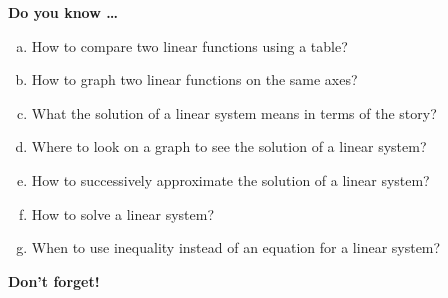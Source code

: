 \newpage



\bigskip

\noindent \textbf{Do you know \ldots} %

\begin{enumerate} [(a)]
\item How to compare two linear functions using a table? 
\item How to graph two linear functions on the same axes? 
\item What the solution of a linear system means in terms of the story? 
\item Where to look on a graph to see the solution of a linear system? 
\item How to successively approximate the solution of a linear system? 
\item How to solve a linear system? 
\item When to use inequality instead of an equation for a linear system? 
\end{enumerate}

\bigskip

\noindent \textbf{Don't forget!}
